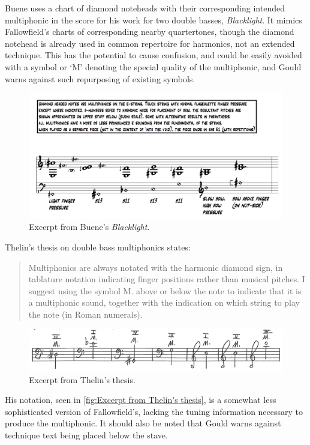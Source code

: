 Buene uses a chart of diamond noteheads with their corresponding intended multiphonic in the score for his work for two double basses, \emph{Blacklight}.\autocite[39--42]{thelinMultiphonicsDoubleBass2011}
It mimics Fallowfield's charts of corresponding nearby quartertones, though the diamond notehead is already used in common repertoire for harmonics, not an extended technique. 
This has the potential to cause confusion, and could be easily avoided with a symbol or `M' denoting the special quality of the multiphonic, and Gould warns against such repurposing of existing symbols.\autocite[494]{gouldBars2011}

\begin{figure}
  \includegraphics[width=\linewidth]{./resources/bueneMultiphonicNotation.png}
  \caption{Excerpt from Buene's \emph{Blacklight}.}\label{fig:Excerpt from Buene's Blacklight}\end{figure}

Thelin's thesis on double bass multiphonics states:
\begin{quotation}
    Multiphonics are always notated with the harmonic diamond sign, in tablature notation
    indicating finger positions rather than musical pitches. I suggest using the symbol M. above or
    below the note to indicate that it is a multiphonic sound, together with the indication on which
    string to play the note (in Roman numerals).\autocite[6]{thelinMultiphonicsDoubleBass2011}
\end{quotation}


\begin{figure}
    \includegraphics[width=\linewidth]{./resources/thelinMultiphonicNotation.png}
    \caption{Excerpt from Thelin's thesis.}\label{fig:Excerpt from Thelin's thesis}\end{figure}
His notation, seen in \autoref{fig:Excerpt from Thelin's thesis}, is a somewhat less sophisticated version of Fallowfield's, lacking the tuning information necessary to produce the multiphonic. 
It should also be noted that Gould warns against technique text being placed below the stave.\autocite[492]{gouldBars2011}


